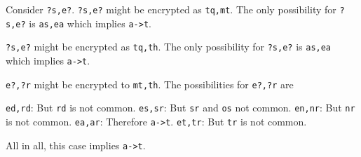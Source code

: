 Consider \verb!?s,e?!. \verb!?s,e?! might be encrypted as \verb!tq,mt!.
The only possibility for \verb!?s,e?! is \verb!as,ea!
which implies \verb!a->t!.

\verb!?s,e?! might be encrypted as \verb!tq,th!.
The only possibility for \verb!?s,e?! is \verb!as,ea!
which implies \verb!a->t!.

\verb!e?,?r! might be encrypted to \verb!mt,th!.
The possibilities for \verb!e?,?r! are
\begin{tightlist}
\li \verb!ed,rd!: But \verb!rd! is not common.
\li \verb!es,sr!: But \verb!sr! and \verb!os! not common.
\li \verb!en,nr!: But \verb!nr! is not common.
\li \verb!ea,ar!: Therefore \verb!a->t!.
\li \verb!et,tr!: But \verb!tr! is not common.
\end{tightlist}
All in all, this case implies \verb!a->t!.

